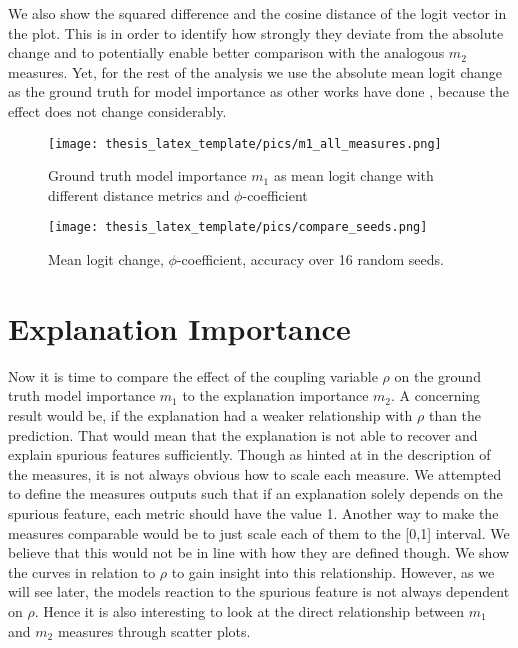 We also show the squared difference and the cosine distance of the logit vector in the plot. This is in order to identify how strongly they deviate from the absolute change and to potentially enable better comparison with the analogous $m_2$ measures.
Yet, for the rest of the analysis we use the absolute mean logit change as the ground truth for model importance as other works have done \cite{Sixt2022a, Achtibat2022}, because the effect does not change considerably.

\begin{figure}[t!]
    \centering
    \texttt{[image: thesis\_latex\_template/pics/m1\_all\_measures.png]}
    \caption[Ground Truth Importance $m_1$]{Ground truth model importance $m_1$ as mean logit change with different distance metrics and $\phi$-coefficient}
    \label{fig:m1_results}
\end{figure}


\begin{figure}[t!]
    \centering
    \texttt{[image: thesis\_latex\_template/pics/compare\_seeds.png]}
    \caption[Comparing Seeds]{Mean logit change, $\phi$-coefficient, accuracy over 16 random seeds.
    }
    \label{fig:gt_over_seeds}
\end{figure}

\section{Explanation Importance}
Now it is time to compare the effect of the coupling variable $\rho$ on the ground truth model importance $m_1$ to the explanation importance $m_2$. 
A concerning result would be, if the explanation had a weaker relationship with $\rho$ than the prediction. That would mean that the explanation is not able to recover and explain spurious features sufficiently. Though as hinted at in the description of the measures, it is not always obvious how to scale each measure. We attempted to define the measures outputs such that if an explanation solely depends on the spurious feature, each metric should have the value 1. 
Another way to make the measures comparable would be to just scale each of them to the [0,1] interval. We believe that this would not be in line with how they are defined though. 
We show the curves in relation to $\rho$ to gain insight into this relationship. However, as we will see later, the models reaction to the spurious feature is not always dependent on $\rho$. Hence it is also interesting to look at the direct relationship between $m_1$ and $m_2$ measures through scatter plots.

